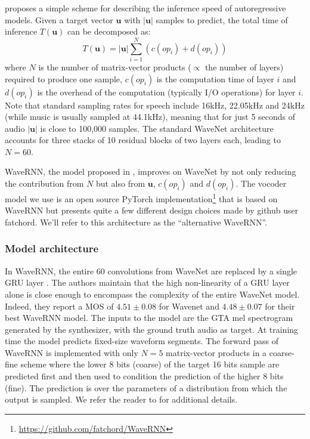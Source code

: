 \documentclass[a4paper, oneside, 12pt, english]{article}
\begin{document}
\citep{WaveRNN} proposes a simple scheme for describing the inference speed of autoregressive models. Given a target vector $\mathbf{u}$ with $|\mathbf{u}|$ samples to predict, the total time of inference $T(\mathbf{u})$ can be decomposed as:
$$ T(\mathbf{u}) = |\mathbf{u}|\sum_{i=1}^{N}(c(op_i) + d(op_i)) $$
where $N$ is the number of matrix-vector products ($\propto$ the number of layers) required to produce one sample, $c(op_i)$ is the computation time of layer $i$ and $d(op_i)$ is the overhead of the computation (typically I/O operations) for layer $i$. Note that standard sampling rates for speech include 16kHz, 22.05kHz and 24kHz (while music is usually sampled at 44.1kHz), meaning that for just 5 seconds of audio $|\mathbf{u}|$ is close to 100,000 samples. The standard WaveNet architecture accounts for three stacks of 10 residual blocks of two layers each, leading to $N = 60$. 

WaveRNN, the model proposed in \citep{WaveRNN}, improves on WaveNet by not only reducing the contribution from $N$ but also from $\mathbf{u}$, $c(op_i)$ and $d(op_i)$. The vocoder model we use is an open source PyTorch implementation\footnote{\url{https://github.com/fatchord/WaveRNN}} that is based on WaveRNN but presents quite a few different design choices made by github user fatchord. We'll refer to this architecture as the ``alternative WaveRNN''.

\subsubsection{Model architecture}
In WaveRNN, the entire 60 convolutions from WaveNet are replaced by a single GRU layer \citep{GRU}. The authors maintain that the high non-linearity of a GRU layer alone is close enough to encompass the complexity of the entire WaveNet model. Indeed, they report a MOS of $4.51 \pm 0.08$ for Wavenet and $4.48 \pm 0.07$ for their best WaveRNN model. The inputs to the model are the GTA mel spectrogram generated by the synthesizer, with the ground truth audio as target. At training time the model predicts fixed-size waveform segments. The forward pass of WaveRNN is implemented with only $N = 5$ matrix-vector products in a coarse-fine scheme where the lower 8 bits (coarse) of the target 16 bits sample are predicted first and then used to condition the prediction of the higher 8 bits (fine). The prediction is over the parameters of a distribution from which the output is sampled. We refer the reader to \citep{WaveRNN} for additional details.
\end{document}
